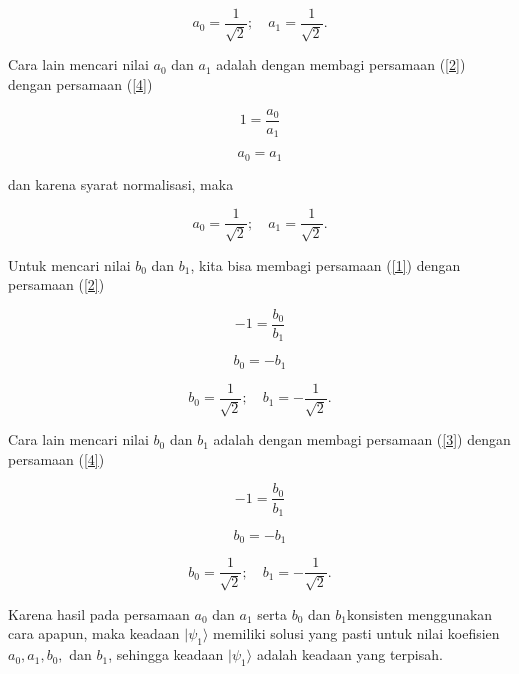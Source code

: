 \begin{equation}
a_0 = \frac{1}{\sqrt{2}} ; \quad
a_1 = \frac{1}{\sqrt{2}}.
\end{equation}

Cara lain mencari nilai $a_0$ dan $a_1$ adalah dengan membagi persamaan (\ref{2}) dengan persamaan (\ref{4})

\begin{equation}
1 = \frac{a_0}{a_1}
\end{equation}

\begin{equation}
a_0 = a_1
\end{equation}

dan karena syarat normalisasi, maka

\begin{equation}
a_0 = \frac{1}{\sqrt{2}} ; \quad
a_1 = \frac{1}{\sqrt{2}}.
\end{equation}

Untuk mencari nilai $b_0$ dan $b_1$, kita bisa membagi persamaan (\ref{1}) dengan persamaan (\ref{2})

\begin{equation}
-1 = \frac{b_0}{b_1}
\end{equation}

\begin{equation}
b_0 = - b_1
\end{equation}

\begin{equation}
b_0 = \frac{1}{\sqrt{2}} ; \quad
b_1 = -\frac{1}{\sqrt{2}}.
\end{equation}

Cara lain mencari nilai $b_0$ dan $b_1$ adalah dengan membagi persamaan (\ref{3}) dengan persamaan (\ref{4})

\begin{equation}
-1 = \frac{b_0}{b_1}
\end{equation}

\begin{equation}
b_0 = - b_1
\end{equation}

\begin{equation}
b_0 = \frac{1}{\sqrt{2}} ; \quad
b_1 = -\frac{1}{\sqrt{2}}.
\end{equation}

Karena hasil pada persamaan $a_0$ dan $a_1$ serta $b_0$ dan $b_1$konsisten menggunakan cara apapun, maka keadaan $|\psi_1\rangle$ memiliki solusi yang pasti untuk nilai koefisien $a_0, a_1, b_0,$ dan $b_1$,
sehingga keadaan $|\psi_1\rangle$ adalah keadaan yang terpisah.

